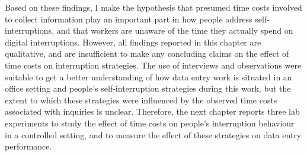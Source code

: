 Based on these findings, I make the hypothesis that presumed time costs involved to collect information play an important part in how people address self-interruptions, and that workers are unaware of the time they actually spend on digital interruptions. However, all findings reported in this chapter are qualitative, and are insufficient to make any concluding claims on the effect of time costs on interruption strategies. The use of interviews and observations were suitable to get a better understanding of how data entry work is situated in an office setting and people's self-interruption strategies during this work, but the extent to which these strategies were influenced by the observed time costs associated with inquiries is unclear. Therefore, the next chapter reports three lab experiments to study the effect of time costs on people's interruption behaviour in a controlled setting, and to measure the effect of these strategies on data entry performance.

